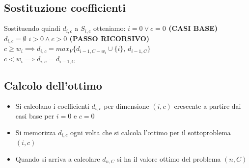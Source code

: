 \subsection{Sostituzione coefficienti}
Sostituendo quindi $d_{i,c}$ a $S_{i,c}$ otteniamo:
\textbf{$i=0 \vee c=0$ (CASI BASE)}\\
$d_{i,c} = \emptyset$
\textbf{$i>0 \wedge c>0$ (PASSO RICORSIVO)}\\
$c \geq w_i \implies d_{i,c} = max_V\{d_{i-1,C-w_i} \cup \{i\},\,d_{i-1,C}\}$\\
$c < w_i \implies d_{i,c} = d_{i-1,C}$\\
\subsection{Calcolo dell'ottimo}
\begin{itemize}
    \item Si calcolano i coefficienti $d_{i,c}$ per dimensione $(i,c)$ crescente
    a partire dai casi base per $i=0$ e $c=0$
    \item Si memorizza $d_{i,c}$ ogni volta che si calcola l'ottimo per il sottoproblema $(i,c)$
    \item Quando si arriva a calcolare $d_{n,C}$ si ha il valore ottimo del problema $(n,C)$ 
\end{itemize}

